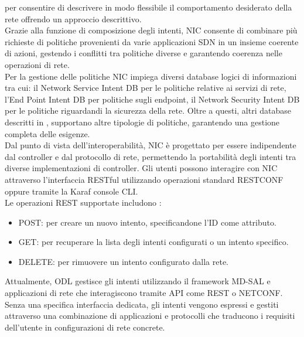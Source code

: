 per consentire di descrivere in modo flessibile il comportamento desiderato della rete offrendo un approccio descrittivo.
\\Grazie alla funzione di composizione degli intenti, NIC consente di combinare più richieste di politiche provenienti da varie applicazioni SDN in un insieme coerente di azioni,
gestendo i conflitti tra politiche diverse e garantendo coerenza nelle operazioni di rete.
\\Per la gestione delle politiche NIC impiega diversi database logici di informazioni tra cui: il Network Service Intent DB per le politiche relative ai servizi di rete,
l'End Point Intent DB per politiche sugli endpoint, il Network Security Intent DB per le politiche riguardandi la sicurezza della rete.
Oltre a questi, altri database descritti in \cite{NICProposal}, supportano altre tipologie di politiche, garantendo una gestione completa delle esigenze.
\\Dal punto di vista dell'interoperabilità, NIC è progettato per essere indipendente dal controller e dal protocollo di rete, 
permettendo la portabilità degli intenti tra diverse implementazioni di controller.
Gli utenti possono interagire con NIC attraverso l'interfaccia RESTful utilizzando operazioni standard RESTCONF oppure tramite la Karaf console CLI.
\\Le operazioni REST supportate includono \cite{nic}:
\begin{itemize}
    \item POST: per creare un nuovo intento, specificandone l'ID come attributo.
    \item GET: per recuperare la lista degli intenti configurati o un intento specifico.
    \item DELETE: per rimuovere un intento configurato dalla rete.
\end{itemize}
Attualmente, ODL gestisce gli intenti utilizzando il framework MD-SAL e applicazioni di rete che interagiscono tramite API come REST o NETCONF.
Senza una specifica interfaccia dedicata, gli intenti vengono espressi e gestiti attraverso una combinazione di applicazioni e protocolli che traducono i requisiti dell'utente in configurazioni di rete concrete.
